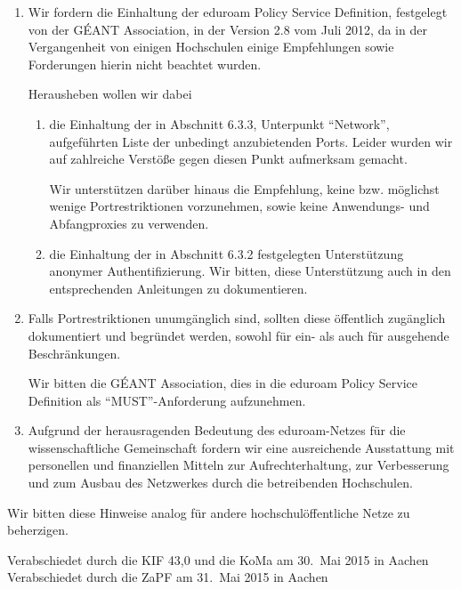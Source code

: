 \documentclass[DIV=calc]{scrartcl}
\begin{document}
\begin{enumerate}
\item Wir fordern die Einhaltung der eduroam Policy Service Definition,
  festgelegt von der GÉANT Association, in der Version 2.8 vom Juli 2012, da
  in der Vergangenheit von einigen Hochschulen einige Empfehlungen sowie
  Forderungen hierin nicht beachtet wurden.

  Herausheben wollen wir dabei
  \begin{enumerate}
  \item  die Einhaltung der in Abschnitt 6.3.3, Unterpunkt ``Network'',
    aufgeführten Liste der unbedingt anzubietenden Ports. Leider wurden wir
    auf zahlreiche Verstöße gegen diesen Punkt aufmerksam gemacht.

    Wir unterstützen darüber hinaus die Empfehlung, keine
    bzw. möglichst wenige Portrestriktionen vorzunehmen, sowie keine
    Anwendungs- und Abfangproxies zu verwenden.

  \item die Einhaltung der in Abschnitt 6.3.2 festgelegten Unterstützung
    anonymer Authentifizierung. Wir bitten, diese Unterstützung auch in den
    entsprechenden Anleitungen zu dokumentieren.
  \end{enumerate}
\item Falls Portrestriktionen unumgänglich sind, sollten diese öffentlich
  zugänglich dokumentiert und begründet werden, sowohl für ein- als auch für
  ausgehende Beschränkungen.

  Wir bitten die GÉANT Association, dies in die eduroam Policy Service Definition
  als ``MUST''-Anforderung aufzunehmen.

\item Aufgrund der herausragenden Bedeutung des eduroam-Netzes für die
  wissenschaftliche Gemeinschaft fordern wir eine ausreichende Ausstattung mit
  personellen und finanziellen Mitteln zur Aufrechterhaltung, zur Verbesserung
  und zum Ausbau des Netzwerkes durch die betreibenden Hochschulen.
\end{enumerate}

Wir bitten diese Hinweise analog für andere hochschulöffentliche Netze zu
beherzigen.

\vfill
\begin{flushright}
Verabschiedet durch die KIF 43,0 und die KoMa am 30.~Mai 2015 in Aachen \\
Verabschiedet durch die ZaPF am 31.~Mai 2015 in Aachen
\end{flushright}
\end{document}
